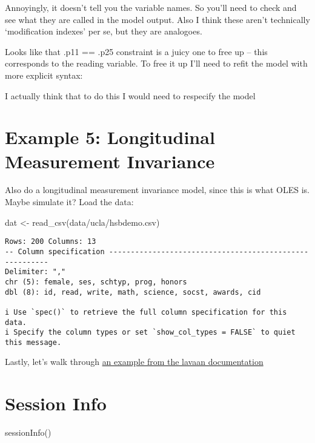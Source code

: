 \documentclass[
  letterpaper,
  DIV=11,
  numbers=noendperiod]{scrreprt}
\newenvironment{Shaded}{\begin{snugshade}}{\end{snugshade}}
\newcommand{\FunctionTok}[1]{\textcolor[rgb]{0.28,0.35,0.67}{#1}}
\newcommand{\NormalTok}[1]{\textcolor[rgb]{0.00,0.23,0.31}{#1}}
\newcommand{\OtherTok}[1]{\textcolor[rgb]{0.00,0.23,0.31}{#1}}
\newcommand{\StringTok}[1]{\textcolor[rgb]{0.13,0.47,0.30}{#1}}
\begin{document}
Annoyingly, it doesn't tell you the variable names. So you'll need to
check and see what they are called in the model output. Also I think
these aren't technically `modification indexes' per se, but they are
analogoes.

Looks like that .p11 == .p25 constraint is a juicy one to free up --
this corresponds to the reading variable. To free it up I'll need to
refit the model with more explicit syntax:

I actually think that to do this I would need to respecify the model

\hypertarget{example-5-longitudinal-measurement-invariance}{%
\section{Example 5: Longitudinal Measurement
Invariance}\label{example-5-longitudinal-measurement-invariance}}

Also do a longitudinal measurement invariance model, since this is what
OLES is. Maybe simulate it? Load the data:

\begin{Shaded}
\begin{Highlighting}[]
\NormalTok{dat }\OtherTok{\textless{}{-}} \FunctionTok{read\_csv}\NormalTok{(}\StringTok{\textquotesingle{}data/ucla/hsbdemo.csv\textquotesingle{}}\NormalTok{)}
\end{Highlighting}
\end{Shaded}

\begin{verbatim}
Rows: 200 Columns: 13
-- Column specification --------------------------------------------------------
Delimiter: ","
chr (5): female, ses, schtyp, prog, honors
dbl (8): id, read, write, math, science, socst, awards, cid

i Use `spec()` to retrieve the full column specification for this data.
i Specify the column types or set `show_col_types = FALSE` to quiet this message.
\end{verbatim}

Lastly, let's walk through
\href{https://www.lavaan.ugent.be/tutorial/cfa.html}{an example from the
lavaan documentation}

\hypertarget{session-info}{%
\section{Session Info}\label{session-info}}

\begin{Shaded}
\begin{Highlighting}[]
\FunctionTok{sessionInfo}\NormalTok{()}
\end{Highlighting}
\end{Shaded}
\end{document}
